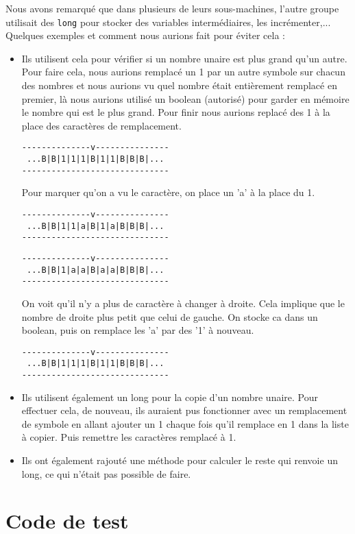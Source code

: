 \documentclass[a4paper,11pt]{article}
\begin{document}
Nous avons remarqué que dans plusieurs de leurs sous-machines, l'autre groupe utilisait des \texttt{long} pour stocker des variables intermédiaires, les incrémenter,...
Quelques exemples et comment nous aurions fait pour éviter cela :
\begin{itemize}
\item Ils utilisent cela pour vérifier si un nombre unaire est plus grand qu'un autre. Pour faire cela, nous aurions remplacé un 1 par un autre symbole sur chacun des nombres et nous aurions vu quel nombre était entièrement remplacé en premier, là nous aurions utilisé un boolean (autorisé) pour garder en mémoire le nombre qui est le plus grand. Pour finir nous aurions replacé des 1 à la place des caractères de remplacement.
\begin{verbatim}
--------------v---------------
 ...B|B|1|1|1|B|1|1|B|B|B|...
------------------------------
\end{verbatim}
Pour marquer qu'on a vu le caractère, on place un 'a' à la place du 1.
\begin{verbatim}
--------------v---------------
 ...B|B|1|1|a|B|1|a|B|B|B|...
------------------------------
\end{verbatim}
\begin{verbatim}
--------------v---------------
 ...B|B|1|a|a|B|a|a|B|B|B|...
------------------------------
\end{verbatim}
On voit qu'il n'y a plus de caractère à changer à droite. Cela implique que le nombre de droite plus petit que celui de gauche. On stocke ca dans un boolean, puis on remplace les 'a' par des '1' à nouveau.
\begin{verbatim}
--------------v---------------
 ...B|B|1|1|1|B|1|1|B|B|B|...
------------------------------
\end{verbatim}
\item Ils utilisent également un long pour la copie d'un nombre unaire. Pour effectuer cela, de nouveau, ils auraient pus fonctionner avec un remplacement de symbole en allant ajouter un 1 chaque fois qu'il remplace en 1 dans la liste à copier. Puis remettre les caractères remplacé à 1.
\item Ils ont également rajouté une méthode pour calculer le reste qui renvoie un long, ce qui n'était pas possible de faire.
\end{itemize}
\appendix
\section{Code de test}

\end{document}
